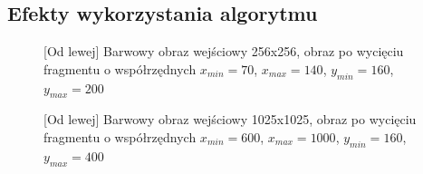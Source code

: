 \documentclass[a4paper,12pt, titlepage]{report}
\begin{document}
\subsection*{Efekty wykorzystania algorytmu}
\begin{figure}[h]
    \centering
    \caption{[Od lewej] Barwowy obraz wejściowy 256x256, obraz po wycięciu fragmentu o współrzędnych \(x_{min}=70\), \(x_{max}=140\), \(y_{min}=160\), \(y_{max}=200\)}%
    \label{fig:rysunek}%
\end{figure}
\FloatBarrier
\begin{figure}[h]
    \centering
    \caption{[Od lewej] Barwowy obraz wejściowy 1025x1025, obraz po wycięciu fragmentu o współrzędnych \(x_{min}=600\), \(x_{max}=1000\), \(y_{min}=160\), \(y_{max}=400\)}%
    \label{fig:rysunek}%
\end{figure}
\FloatBarrier
\end{document}
